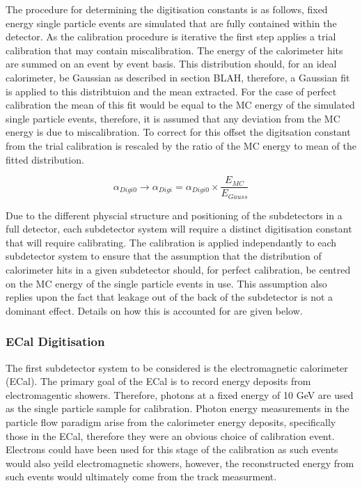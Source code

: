 The procedure for determining the digitisation constants is as follows, fixed energy single particle events are simulated that are fully contained within the detector.  As the calibration procedure is iterative the first step applies a trial calibration that may contain miscalibration.  The energy of the calorimeter hits are summed on an event by event basis.  This distribution should, for an ideal calorimeter, be Gaussian as described in section BLAH, therefore, a Gaussian fit is applied to this distribtuion and the mean extracted.  For the case of perfect calibration the mean of this fit would be equal to the MC energy of the simulated single particle events, therefore, it is assumed that any deviation from the MC energy is due to miscalibration.  To correct for this offset the digitsation constant from the trial calibration is rescaled by the ratio of the MC energy to mean of the fitted distribution.

\begin{equation}
\alpha_{Digi0} \rightarrow \alpha_{Digi} = \alpha_{Digi0} \times \frac{E_{MC}}{E_{Gauss}}
\end{equation}

Due to the different physcial structure and positioning of the subdetectors in a full detector, each subdetector system will require a distinct digitisation constant that will require calibrating.  The calibration is applied independantly to each subdetector system to ensure that the assumption that the distribution of calorimeter hits in a given subdetector should, for perfect calibration, be centred on the MC energy of the single particle events in use.  This assumption also replies upon the fact that leakage out of the back of the subdetector is not a dominant effect.  Details on how this is accounted for are given below.

\subsubsection{ECal Digitisation}

The first subdetector system to be considered is the electromagnetic calorimeter (ECal).  The primary goal of the ECal is to record energy deposits from electromagentic showers.  Therefore, photons at a fixed energy of 10 GeV are used as the single particle sample for calibration.  Photon energy measurements in the particle flow paradigm arise from the calorimeter energy deposits, specifically those in the ECal, therefore they were an obvious choice of calibration event.  Electrons could have been used for this stage of the calibration as such events would also yeild electromagnetic showers, however, the reconstructed energy from such events would ultimately come from the track measurment.  

